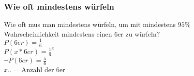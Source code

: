 \subsubsection{Wie oft mindestens würfeln}

\hfill \break
Wie oft mus man mindestens würfeln, um mit mindestens $95\%$ Wahrscheinlichkeit mindestens einen 6er zu würfeln?\\
$P(6er) = \frac{1}{6}$\\
$P(x*6er) = \frac{1}{6}^x$\\
$\lnot P(6er) = \frac{5}{6}$\\

\hfill \break
$x..$ = Anzahl der 6er

\hfill \break
\fboxrule=0.8pt 